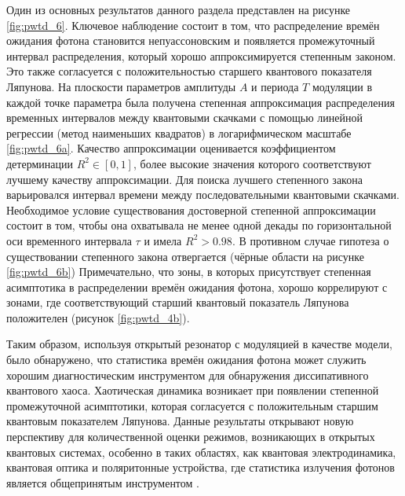 Один из основных результатов данного раздела представлен на рисунке \cref{fig:pwtd_6}.
Ключевое наблюдение состоит в том, что распределение времён ожидания фотона становится непуассоновским и появляется промежуточный интервал распределения, который хорошо аппроксимируется степенным законом. Это также согласуется с положительностью старшего квантового показателя Ляпунова.
На плоскости параметров амплитуды $A$ и периода $T$ модуляции в каждой точке параметра была получена степенная аппроксимация распределения временных интервалов между квантовыми скачками с помощью линейной регрессии (метод наименьших квадратов) в логарифмическом масштабе \cref{fig:pwtd_6a}.
Качество аппроксимации оценивается коэффициентом детерминации \cite{Draper1998} $R^2 \in \left[0, 1\right]$, более высокие значения которого соответствуют лучшему качеству аппроксимации.
Для поиска лучшего степенного закона варьировался интервал времени между последовательными квантовыми скачками. Необходимое условие существования достоверной степенной аппроксимации состоит в том, чтобы она охватывала не менее одной декады по горизонтальной оси временного интервала $\tau$ и имела $R^2> 0.98$.
В противном случае гипотеза о существовании степенного закона отвергается (чёрные области на рисунке \cref{fig:pwtd_6b})  Примечательно, что зоны, в которых присутствует степенная асимптотика в распределении времён ожидания фотона, хорошо коррелируют с зонами, где соответствующий старший квантовый показатель Ляпунова положителен (рисунок \cref{fig:pwtd_4b}).

Таким образом, используя открытый резонатор с модуляцией в качестве модели, было обнаружено, что статистика времён ожидания фотона может служить хорошим диагностическим инструментом для обнаружения диссипативного квантового хаоса.
Хаотическая динамика возникает при появлении степенной промежуточной асимптотики, которая согласуется с положительным старшим квантовым показателем Ляпунова.
Данные результаты открывают новую перспективу для количественной оценки режимов, возникающих в открытых квантовых системах, особенно в таких областях, как квантовая электродинамика, квантовая оптика и поляритонные устройства, где статистика излучения фотонов является общепринятым инструментом \cite{Delteil2014, Brange2019}. 




